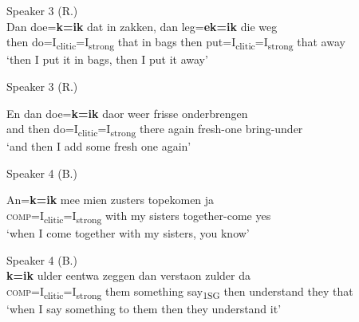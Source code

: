 \documentclass[output=paper,hidelinks,draftmode]{langscibook}
\begin{document}
\z


\ea Speaker 3 (R.)\\
\label{ex:schaffel:16}
\gll Dan doe=\textbf{k=ik} dat in zakken, dan {leg=}\textbf{ek=ik} die weg\\
then do=I\textsubscript{clitic}=I\textsubscript{strong} that in bags then put=I\textsubscript{clitic}=I\textsubscript{strong} that away\\
\glt ‘then I put it in bags, then I put it away’ 

\z


\ea Speaker 3 (R.)
\label{ex:schaffel:17}

\gll En dan doe=\textbf{k=ik} daor weer frisse onderbrengen\\
and then do=I\textsubscript{clitic}=I\textsubscript{strong} there again fresh-one bring-under\\
\glt ‘and then I add some fresh one again’ 

\z


\ea Speaker 4 (B.)\\
\label{ex:schaffel:18}

\gll An=\textbf{k=ik} mee mien zusters topekomen ja\\
\textsc{comp}=I\textsubscript{clitic}=I\textsubscript{strong} with my sisters together-come yes\\
\glt ‘when I come together with my sisters, you know’

\z




\ea Speaker 4 (B.)\\
\label{ex:schaffel:19}
\textbf{k=ik} ulder eentwa zeggen dan verstaon zulder da\\
\textsc{comp}=I\textsubscript{clitic}=I\textsubscript{strong} them something say\textsubscript{1SG} then understand they that\\
\glt ‘when I say something to them then they understand it’
\z
 
\end{document}
